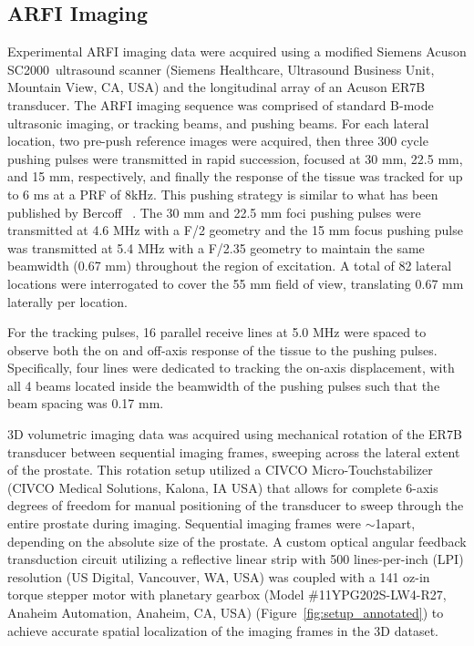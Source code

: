 \subsection{ARFI Imaging}
Experimental ARFI imaging data were acquired using a modified Siemens Acuson
SC2000\texttrademark~ultrasound scanner (Siemens Healthcare, Ultrasound Business Unit,
Mountain View, CA, USA) and the longitudinal array of an Acuson ER7B
transducer.  The ARFI imaging sequence was comprised of
standard B-mode ultrasonic imaging, or tracking beams, and pushing beams. For
each lateral location, two pre-push reference images were acquired, then three
300 cycle pushing pulses were transmitted in rapid succession, focused at 30
mm, 22.5 mm, and 15 mm, respectively, and finally the response of the tissue
was tracked for up to 6 ms at a PRF of 8kHz. This pushing strategy is similar to
what has been published by Bercoff \etal~\cite{Bercoff2004}. The 30 mm and 22.5
mm foci pushing pulses were transmitted at 4.6 MHz with a F/2 geometry and the
15 mm focus pushing pulse was transmitted at 5.4 MHz with a F/2.35 geometry to
maintain the same beamwidth (0.67 mm) throughout the region of excitation. A
total of 82 lateral locations were interrogated to cover the 55 mm field of
view, translating 0.67 mm laterally per location.

For the tracking pulses, 16 parallel receive lines at 5.0 MHz were spaced to
observe both the on and off-axis response of the tissue to the pushing pulses.
Specifically, four lines were dedicated to tracking the on-axis displacement,
with all 4 beams located inside the beamwidth of the pushing pulses such that
the beam spacing was 0.17 mm. 

3D volumetric imaging data was acquired using mechanical rotation of the ER7B
transducer between sequential imaging frames, sweeping across the lateral
extent of the prostate.  This rotation setup utilized a CIVCO
Micro-Touch\texttrademark stabilizer (CIVCO Medical Solutions, Kalona, IA USA)
that allows for complete 6-axis degrees of freedom for manual positioning of
the transducer to sweep through the entire prostate during imaging.  Sequential
imaging frames were $\sim$1\degree apart, depending on the absolute size of the
prostate.  A custom optical angular feedback transduction circuit utilizing a
reflective linear strip with 500 lines-per-inch (LPI) resolution (US Digital,
Vancouver, WA, USA) was coupled with a 141 oz-in torque stepper motor with
planetary gearbox (Model \#11YPG202S-LW4-R27, Anaheim Automation, Anaheim, CA,
USA) (Figure~\ref{fig:setup_annotated}) to achieve accurate spatial
localization of the imaging frames in the 3D dataset.

